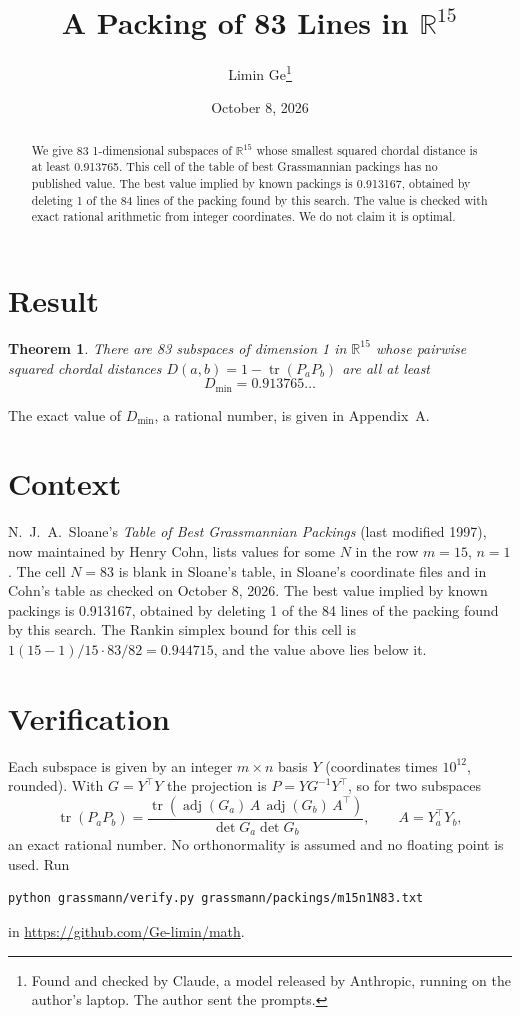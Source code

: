 \documentclass[11pt,a4paper]{article}
\title{A Packing of 83 Lines in $\mathbb{R}^{15}$}
\author{Limin Ge\thanks{Found and checked by Claude, a model released by Anthropic, running on the author's laptop. The author sent the prompts.}}
\date{October 8, 2026}
\newtheorem*{theorem}{Theorem}
\begin{document}
\maketitle
\begin{abstract}
We give 83 1-dimensional subspaces of $\mathbb{R}^{15}$ whose smallest squared chordal distance is at least 0.913765. This cell of the table of best Grassmannian packings has no published value. The best value implied by known packings is 0.913167, obtained by deleting 1 of the 84 lines of the packing found by this search. The value is checked with exact rational arithmetic from integer coordinates. We do not claim it is optimal.
\end{abstract}

\section{Result}
\begin{theorem}
There are 83 subspaces of dimension 1 in $\mathbb{R}^{15}$ whose pairwise squared chordal distances $D(a,b) = 1 - \operatorname{tr}(P_aP_b)$ are all at least
\[ D_{\min} = 0.913765\ldots \]
\end{theorem}
The exact value of $D_{\min}$, a rational number, is given in Appendix~A.


\section{Context}
N.~J.~A.~Sloane's \emph{Table of Best Grassmannian Packings} (last modified 1997), now maintained by Henry Cohn, lists values for some $N$ in the row $m=15$, $n=1$. The cell $N=83$ is blank in Sloane's table, in Sloane's coordinate files and in Cohn's table as checked on October 8, 2026. The best value implied by known packings is 0.913167, obtained by deleting 1 of the 84 lines of the packing found by this search. The Rankin simplex bound for this cell is $1(15-1)/15\cdot 83/82 = 0.944715$, and the value above lies below it.


\section{Verification}
Each subspace is given by an integer $m\times n$ basis $Y$ (coordinates times $10^{12}$, rounded). With $G=Y^\top Y$ the projection is $P=YG^{-1}Y^\top$, so for two subspaces
\[ \operatorname{tr}(P_aP_b)=\frac{\operatorname{tr}(\operatorname{adj}(G_a)\,A\,\operatorname{adj}(G_b)\,A^\top)}{\det G_a\det G_b},\qquad A=Y_a^\top Y_b, \]
an exact rational number. No orthonormality is assumed and no floating point is used. Run
\begin{verbatim}
python grassmann/verify.py grassmann/packings/m15n1N83.txt
\end{verbatim}
in \url{https://github.com/Ge-limin/math}.
\end{document}
